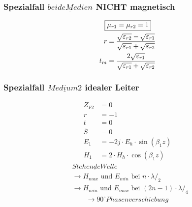 \subsubsection[Spezialfall beide Medien NICHT magnetisch]{Spezialfall $\underline{beide Medien}$ NICHT magnetisch}
\begin{align*}
    \Aboxed{ & \mu_{r1} = \mu_{r2} = 1}                                                                                    \\
    r        & = \frac{\sqrt{\varepsilon_{r2}}-\sqrt{\varepsilon_{r1}}}{{\sqrt{\varepsilon_{r1}}+\sqrt{\varepsilon_{r2}}}} \\
    t_m      & = \frac{2\sqrt{\varepsilon_{r1}}}{\sqrt{\varepsilon_{r1}}+\sqrt{\varepsilon_{r2}}}
\end{align*}

\subsubsection[Spezialfall Medium 2 idealer Leiter]{Spezialfall $\underline{Medium 2}$ idealer Leiter}
\begin{align*}
    Z_{F2}       & = 0                                 \\
    r            & = -1                                \\
    t            & = 0                                 \\
    \overline{S} & = 0                                 \\
    E_1          & = -2j\cdot E_h\cdot \sin(\beta_1 z) \\
    H_1          & = 2\cdot H_h\cdot \cos(\beta_1 z)
\end{align*}
\begin{align*}
     & \underline{Stehende Welle}                                              \\
     & \rightarrow \text{$H_{max}$ und $E_{min}$ bei } n \cdot \lambda/_2      \\
     & \rightarrow \text{$H_{min}$ und $E_{max}$ bei } (2n-1) \cdot \lambda/_4 \\
     & \qquad \rightarrow 90^\circ Phasenverschiebung
\end{align*}

\newpage

